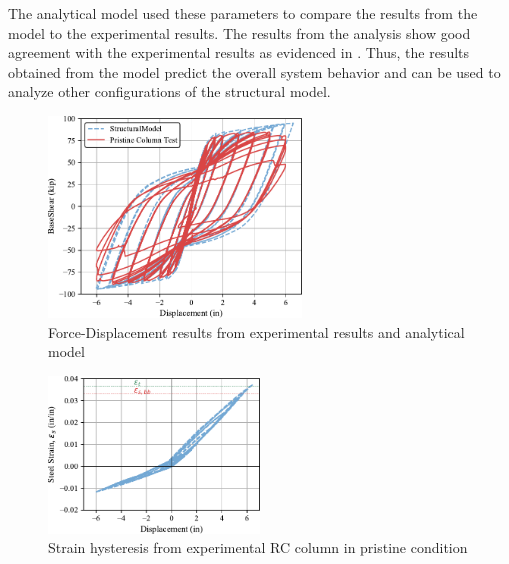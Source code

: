The analytical model used these parameters to compare the results from the model to the experimental results. The results from the analysis show good agreement with the experimental results as evidenced in . Thus, the results obtained from the model predict the overall system behavior and can be used to analyze other configurations of the structural model.
\begin{figure}[htbp]
	\centering
	\includegraphics[width=0.60\textwidth]{Chapter-5/figs/Calibration_Test_26_Goodnight_et_al.pdf}
	\caption{Force-Displacement results from experimental results \cite{Goodnight2013} and analytical model}
	\label{fig:ModelCalibration}
\end{figure}

\begin{figure}[htbp]
	\centering
	\includegraphics[width=0.5\textwidth]{VAC Thesis 2.0/Chapter-5/figs/Calibration_Test_26_Goodnight_et_al_strain.pdf}
	\caption{Strain hysteresis from experimental RC column in pristine condition}
	\label{fig:ModelCalibration_Pristine_Hysteresis}
\end{figure}

